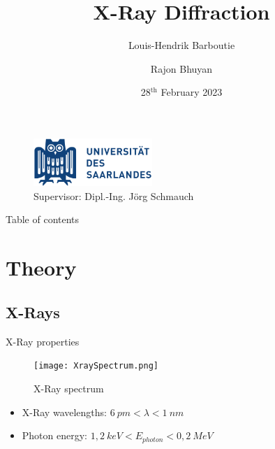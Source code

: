 \documentclass{beamer}
\title{X-Ray Diffraction}
\author{Louis-Hendrik Barboutie \and Rajon Bhuyan}
\date{28$^{\text{th}}$ February 2023}
\begin{document}
\begin{frame}
    \maketitle
    \begin{figure}
        \centering
        \includegraphics[width=0.4\textwidth]{logo_uni.png}
        \centering \\
        Supervisor: Dipl.-Ing. Jörg Schmauch
    \end{figure}
\end{frame}

\begin{frame}{Table of contents}
    \tableofcontents
\end{frame}

\section{Theory}

\subsection{X-Rays}

\begin{frame}{X-Ray properties}
    \begin{figure}
        \centering
        \texttt{[image: XraySpectrum.png]}
        \caption{X-Ray spectrum}
    \end{figure}
    \begin{itemize}
        \item X-Ray wavelengths: $6 \ \si{pm} < \lambda < 1 \ \si{nm}$
        \item Photon energy: $1,2 \ \si{keV} < E_{photon} < 0,2 \ \si{MeV}$
    \end{itemize}
\end{frame}
\end{document}
